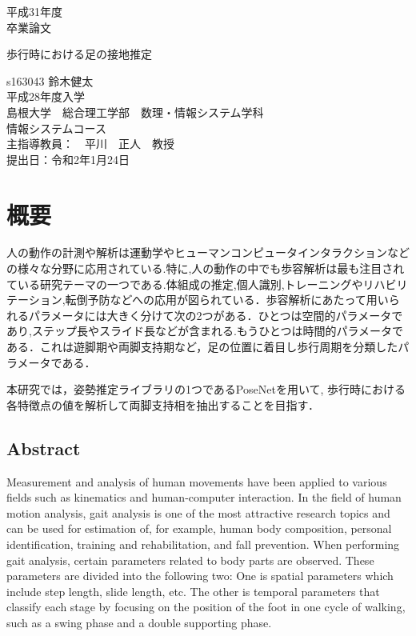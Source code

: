 \documentclass[a4j,10.5pt]{jreport}
\begin{document}
\begin{titlepage}

\vspace{40mm}
\begin{center}
{\Large 平成31年度\\卒業論文}\\[80mm]
\end{center}

\begin{center}
{\huge 歩行時における足の接地推定}\\[80mm]
\end{center}

\begin{flushright}
{\large s163043 鈴木健太}\\[1mm]
{\large 平成28年度入学}\\[1mm]
{\large 島根大学　総合理工学部　数理・情報システム学科}\\[1mm]
{\large 情報システムコース}\\[8mm]
{\large 主指導教員：　平川　正人　教授}\\[3mm]
{\large 提出日：令和2年1月24日}\\%
\end{flushright}
\end{titlepage}

\newpage

\chapter*{概要}
人の動作の計測や解析は運動学やヒューマンコンピュータインタラクションなどの様々な分野に応用されている.特に,人の動作の中でも歩容解析は最も注目されている研究テーマの一つである.体組成の推定\cite{cite1},個人識別,トレーニングやリハビリテーション,転倒予防などへの応用が図られている．歩容解析にあたって用いられるパラメータには大きく分けて次の2つがある．ひとつは空間的パラメータであり,ステップ長やスライド長などが含まれる.もうひとつは時間的パラメータである．これは遊脚期や両脚支持期\cite{cite2}など，足の位置に着目し歩行周期を分類したパラメータである．

本研究では，姿勢推定ライブラリの1つであるPoseNetを用いて,
歩行時における各特徴点の値を解析して両脚支持相を抽出することを目指す．

\section*{Abstract}
Measurement and analysis of human movements have been applied to various fields such as kinematics and human-computer interaction. In the field of human motion analysis, gait analysis is one of the most attractive research topics and can be used for estimation of, for example, human body composition, personal identification, training and rehabilitation, and fall prevention. When performing gait analysis, certain parameters related to body parts are observed. These parameters are divided into the following two: One is spatial parameters which include step length, slide length, etc. The other is temporal parameters that classify each stage by focusing on the position of the foot in one cycle of walking, such as a swing phase and a double supporting phase.
\end{document}
